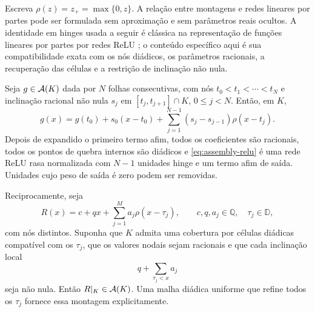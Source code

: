 Escreva $\rho(z)=z_+=\max\{0,z\}$. A relação entre montagens e redes
lineares por partes pode ser formulada sem aproximação e sem parâmetros reais
ocultos. A identidade em hinges usada a seguir é clássica na representação de
funções lineares por partes por redes ReLU
\citep{yarotsky2017,devorehaninpetrova2021,daubechies2022}; o conteúdo
específico aqui é sua compatibilidade exata com os nós diádicos, os parâmetros
racionais, a recuperação das células e a restrição de inclinação não nula.

\begin{theorem}
\label{thm:assembly-relu}
Seja $g\in\mathcal{A}(K)$ dada por $N$ folhas consecutivas, com nós
$t_0<t_1<\cdots<t_N$ e inclinação racional não nula $s_j$ em
$[t_j,t_{j+1}]\cap K$, $0\le j<N$. Então, em $K$,
\begin{equation}
 g(x)=g(t_0)+s_0(x-t_0)
      +\sum_{j=1}^{N-1}(s_j-s_{j-1})\rho(x-t_j).
 \label{eq:assembly-relu}
\end{equation}
Depois de expandido o primeiro termo afim, todos os coeficientes são
racionais, todos os pontos de quebra internos são diádicos e
\eqref{eq:assembly-relu} é uma rede ReLU rasa normalizada com $N-1$ unidades
hinge e um termo afim de saída. Unidades cujo peso de saída é zero podem ser
removidas.

Reciprocamente, seja
\begin{equation}
 R(x)=c+qx+\sum_{j=1}^{M}a_j\rho(x-\tau_j),
 \qquad c,q,a_j\in\mathbb Q,\quad \tau_j\in\mathbb D,
 \label{eq:normalized-relu}
\end{equation}
com nós distintos. Suponha que $K$ admita uma cobertura por células diádicas
compatível com os $\tau_j$, que os valores nodais sejam racionais e que cada
inclinação local
\begin{equation}
 q+\sum_{\tau_j<x}a_j
 \label{eq:relu-local-slope}
\end{equation}
seja não nula. Então $R|_K\in\mathcal{A}(K)$. Uma malha diádica uniforme que
refine todos os $\tau_j$ fornece essa montagem explicitamente.
\end{theorem}

